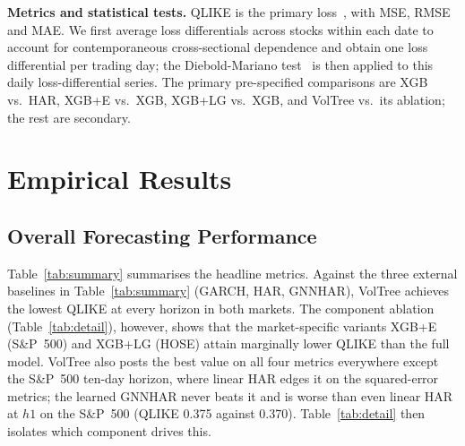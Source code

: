 \documentclass[runningheads,a4paper]{llncs}
\begin{document}
\textbf{Metrics and statistical tests.} QLIKE is the primary loss~\cite{patton2011}, with MSE, RMSE and
MAE. We first average loss differentials across stocks within each date to account for contemporaneous
cross-sectional dependence and obtain one loss differential per trading day; the Diebold-Mariano
test~\cite{dm1995} is then applied to this daily loss-differential series. The primary pre-specified comparisons are XGB vs.\ HAR, XGB+E vs.\ XGB, XGB+LG
vs.\ XGB, and VolTree vs.\ its ablation; the rest are secondary.


\section{Empirical Results}

\subsection{Overall Forecasting Performance}
Table~\ref{tab:summary} summarises the headline metrics. Against the three external baselines in
Table~\ref{tab:summary} (GARCH, HAR, GNNHAR), VolTree achieves the lowest QLIKE at every horizon in
both markets. The component ablation (Table~\ref{tab:detail}), however, shows that the market-specific
variants XGB+E (S\&P~500) and XGB+LG (HOSE) attain marginally lower QLIKE than the full model. VolTree also posts the best value on all four metrics
everywhere except the S\&P~500 ten-day horizon, where linear HAR edges it on the squared-error metrics; the
learned GNNHAR never beats it and is worse than even linear HAR at $h1$ on the S\&P~500 (QLIKE 0.375 against
0.370). Table~\ref{tab:detail} then isolates which component drives this.
\end{document}
